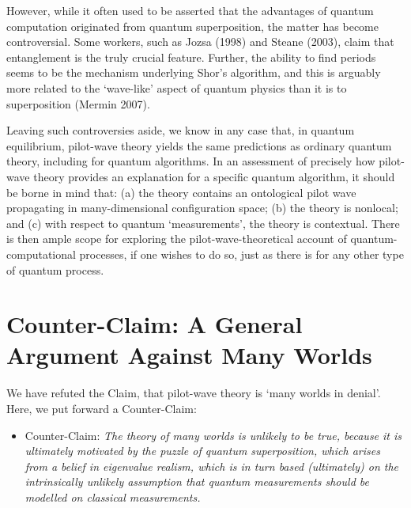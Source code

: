 \documentclass[12pt]{article}%
\begin{document}
However, while it often used to be asserted that the advantages of quantum
computation originated from quantum superposition, the matter has become
controversial. Some workers, such as Jozsa (1998) and Steane (2003), claim
that entanglement is the truly crucial feature. Further, the ability to find
periods seems to be the mechanism underlying Shor's algorithm, and this is
arguably more related to the `wave-like' aspect of quantum physics than it is
to superposition (Mermin 2007).

Leaving such controversies aside, we know in any case that, in quantum
equilibrium, pilot-wave theory yields the same predictions as ordinary quantum
theory, including for quantum algorithms. In an assessment of precisely how
pilot-wave theory provides an explanation for a specific quantum algorithm, it
should be borne in mind that: (a) the theory contains an ontological pilot
wave propagating in many-dimensional configuration space; (b) the theory is
nonlocal; and (c) with respect to quantum `measurements', the theory is
contextual. There is then ample scope for exploring the pilot-wave-theoretical
account of quantum-computational processes, if one wishes to do so, just as
there is for any other type of quantum process.

\section{Counter-Claim: A General Argument Against Many Worlds}

We have refuted the Claim, that pilot-wave theory is `many worlds in denial'.
Here, we put forward a Counter-Claim:

\begin{itemize}
\item Counter-Claim: \textit{The theory of many worlds is unlikely to be true,
because it is ultimately motivated by the puzzle of quantum superposition,
which arises from a belief in eigenvalue realism, which is in turn based
(ultimately) on the intrinsically unlikely assumption that quantum
measurements should be modelled on classical measurements.}
\end{itemize}
\end{document}

